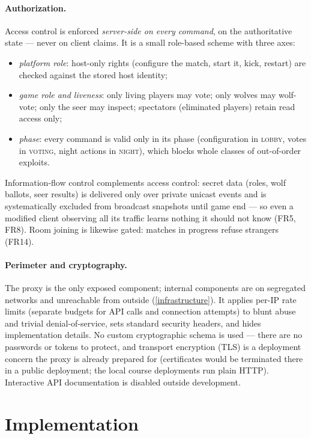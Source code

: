 \documentclass{scrartcl}
\begin{document}
\paragraph{Authorization.}
Access control is enforced \emph{server-side on every command}, on the
authoritative state --- never on client claims. It is a small role-based
scheme with three axes:

\begin{itemize}
  \item \emph{platform role}: host-only rights (configure the match,
  start it, kick, restart) are checked against the stored host identity;
  \item \emph{game role and liveness}: only living players may vote; only
  wolves may wolf-vote; only the seer may inspect; spectators
  (eliminated players) retain read access only;
  \item \emph{phase}: every command is valid only in its phase
  (configuration in \textsc{lobby}, votes in \textsc{voting}, night
  actions in \textsc{night}), which blocks whole classes of
  out-of-order exploits.
\end{itemize}

Information-flow control complements access control: secret data (roles,
wolf ballots, seer results) is delivered only over private unicast events
and is systematically excluded from broadcast snapshots until game end ---
so even a modified client observing all its traffic learns nothing it
should not know (FR5, FR8). Room joining is likewise gated: matches in
progress refuse strangers (FR14).

\paragraph{Perimeter and cryptography.}
The proxy is the only exposed component; internal components are on
segregated networks and unreachable from outside
(\cref{infrastructure}). It applies per-IP rate limits (separate budgets
for API calls and connection attempts) to blunt abuse and trivial
denial-of-service, sets standard security headers, and hides
implementation details. No custom cryptographic schema is used ---
there are no passwords or tokens to protect, and transport encryption
(TLS) is a deployment concern the proxy is already prepared for
(certificates would be terminated there in a public deployment; the local
course deployments run plain HTTP). Interactive API documentation is
disabled outside development.

\section{Implementation}\label{implementation}
\end{document}
